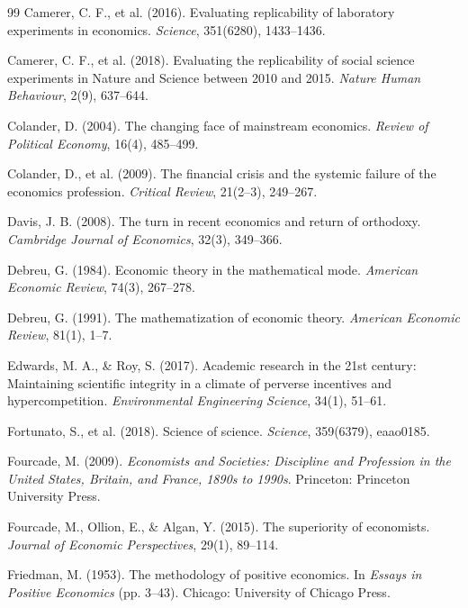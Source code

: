 \documentclass[12pt,a4paper]{article}
\begin{document}
\begin{thebibliography}{99}
Camerer, C. F., et al. (2016). Evaluating replicability of laboratory experiments in economics. \textit{Science}, 351(6280), 1433--1436.

Camerer, C. F., et al. (2018). Evaluating the replicability of social science experiments in Nature and Science between 2010 and 2015. \textit{Nature Human Behaviour}, 2(9), 637--644.

Colander, D. (2004). The changing face of mainstream economics. \textit{Review of Political Economy}, 16(4), 485--499.

Colander, D., et al. (2009). The financial crisis and the systemic failure of the economics profession. \textit{Critical Review}, 21(2--3), 249--267.

Davis, J. B. (2008). The turn in recent economics and return of orthodoxy. \textit{Cambridge Journal of Economics}, 32(3), 349--366.

Debreu, G. (1984). Economic theory in the mathematical mode. \textit{American Economic Review}, 74(3), 267--278.

Debreu, G. (1991). The mathematization of economic theory. \textit{American Economic Review}, 81(1), 1--7.

Edwards, M. A., \& Roy, S. (2017). Academic research in the 21st century: Maintaining scientific integrity in a climate of perverse incentives and hypercompetition. \textit{Environmental Engineering Science}, 34(1), 51--61.

Fortunato, S., et al. (2018). Science of science. \textit{Science}, 359(6379), eaao0185.

Fourcade, M. (2009). \textit{Economists and Societies: Discipline and Profession in the United States, Britain, and France, 1890s to 1990s}. Princeton: Princeton University Press.

Fourcade, M., Ollion, E., \& Algan, Y. (2015). The superiority of economists. \textit{Journal of Economic Perspectives}, 29(1), 89--114.

Friedman, M. (1953). The methodology of positive economics. In \textit{Essays in Positive Economics} (pp. 3--43). Chicago: University of Chicago Press.


\end{thebibliography}
\end{document}
